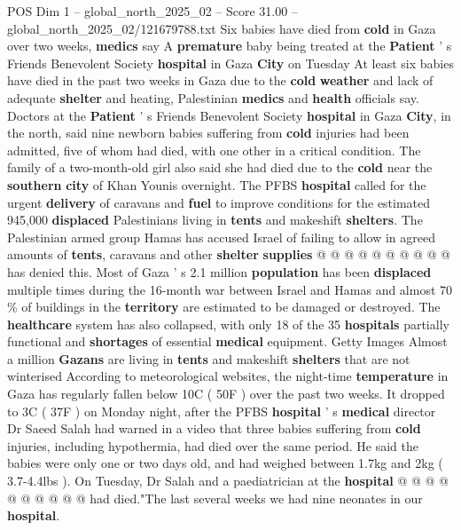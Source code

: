 \begin{textsample}{POS Dim 1 – global\_north\_2025\_02 – Score 31.00 – global\_north\_2025\_02/121679788.txt}  \label{ex:f1_pos_432}
Six babies have died from \textbf{cold} in Gaza over two weeks, \textbf{medics} say A \textbf{premature} baby being treated at the \textbf{Patient} ' s Friends Benevolent Society \textbf{hospital} in Gaza \textbf{City} on Tuesday At least six babies have died in the past two weeks in Gaza due to the \textbf{cold} \textbf{weather} and lack of adequate \textbf{shelter} and heating, Palestinian \textbf{medics} and \textbf{health} officials say.
Doctors at the \textbf{Patient} ' s Friends Benevolent Society \textbf{hospital} in Gaza \textbf{City}, in the north, said nine newborn babies suffering from \textbf{cold} injuries had been admitted, five of whom had died, with one other in a critical condition.
The family of a two-month-old girl also said she had died due to the \textbf{cold} near the \textbf{southern} \textbf{city} of Khan Younis overnight.
The PFBS \textbf{hospital} called for the urgent \textbf{delivery} of caravans and \textbf{fuel} to improve conditions for the estimated 945,000 \textbf{displaced} Palestinians living in \textbf{tents} and makeshift \textbf{shelters}.
The Palestinian armed group Hamas has accused Israel of failing to allow in agreed amounts of \textbf{tents}, caravans and other \textbf{shelter} \textbf{supplies} @ @ @ @ @ @ @ @ @ @ has denied this.
Most of Gaza ' s 2.1 million \textbf{population} has been \textbf{displaced} multiple times during the 16-month war between Israel and Hamas and almost 70 \% of buildings in the \textbf{territory} are estimated to be damaged or destroyed.
The \textbf{healthcare} system has also collapsed, with only 18 of the 35 \textbf{hospitals} partially functional and \textbf{shortages} of essential \textbf{medical} equipment.
Getty Images Almost a million \textbf{Gazans} are living in \textbf{tents} and makeshift \textbf{shelters} that are not winterised According to meteorological websites, the night-time \textbf{temperature} in Gaza has regularly fallen below 10C ( 50F ) over the past two weeks.
It dropped to 3C ( 37F ) on Monday night, after the PFBS \textbf{hospital} ' s \textbf{medical} director Dr Saeed Salah had warned in a video that three babies suffering from \textbf{cold} injuries, including hypothermia, had died over the same period.
He said the babies were only one or two days old, and had weighed between 1.7kg and 2kg ( 3.7-4.4lbs ).
On Tuesday, Dr Salah and a paediatrician at the \textbf{hospital} @ @ @ @ @ @ @ @ @ @ had died."The last several weeks we had nine neonates in our \textbf{hospital}.

\end{textsample}
